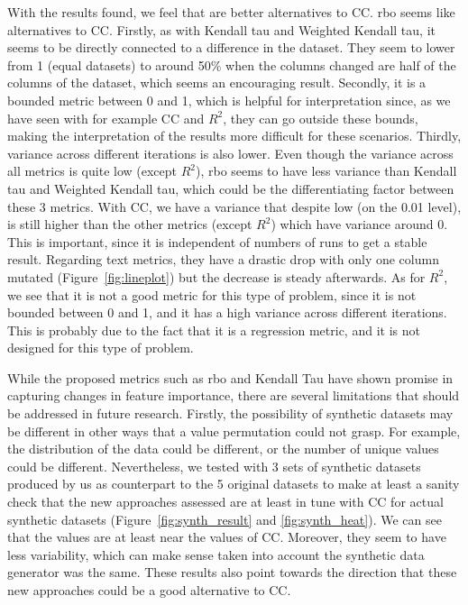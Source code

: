 

With the results found, we feel that are better alternatives to CC. \ac{rbo} seems like alternatives to CC. Firstly, as with Kendall tau and Weighted Kendall tau, it seems to be directly connected to a difference in the dataset. They seem to lower from 1 (equal datasets) to around 50\% when the columns changed are half of the columns of the dataset, which seems an encouraging result. Secondly, it is a bounded metric between 0 and 1, which is helpful for interpretation since, as we have seen with for example CC and $R^2$, they can go outside these bounds, making  the interpretation of the results more difficult for these scenarios. Thirdly, variance across different iterations is also lower. Even though the variance across all metrics is quite low (except $R^2$), \ac{rbo} seems to have less variance than Kendall tau and Weighted Kendall tau, which could be the differentiating factor between these 3 metrics.  With CC, we have a variance that despite low (on the 0.01 level), is still higher than the other metrics (except $R^2$) which have variance around 0. This is important, since it is independent of numbers of runs to get a stable result.
Regarding text metrics, they have a drastic drop with only one column mutated (Figure~\ref{fig:lineplot}) but the decrease is steady afterwards. As for $R^2$, we see that it is not a good metric for this type of problem, since it is not bounded between 0 and 1, and it has a high variance across different iterations. This is probably due to the fact that it is a regression metric, and it is not designed for this type of problem.

While the proposed metrics such as \ac{rbo} and Kendall Tau have shown promise in capturing changes in feature importance, there are several limitations that should be addressed in future research. 
Firstly, the possibility of synthetic datasets may be different in other ways that a value permutation could not grasp. For example, the distribution of the data could be different, or the number of unique values could be different. Nevertheless, we tested with 3 sets of synthetic datasets produced by us as counterpart to the 5 original datasets to make at least a sanity check that the new approaches assessed are at least in tune with CC for actual synthetic datasets (Figure~\ref{fig:synth_result} and \ref{fig:synth_heat}). We can see that the values are at least near the values of CC. Moreover, they seem to have less variability, which can make sense taken into account the synthetic data generator was the same. These results also point towards the direction that these new approaches could be a good alternative to CC.

